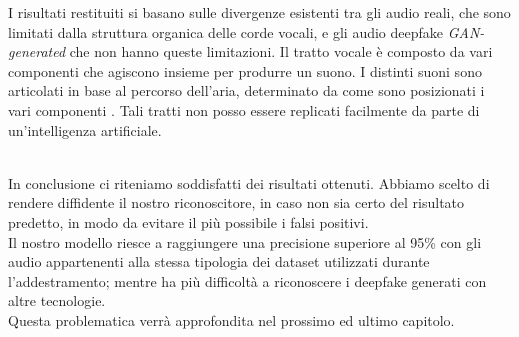 \documentclass[12pt, a4paper]{article}
\begin{document}
\begin{minipage}{0.6\textwidth}
I risultati restituiti si basano sulle divergenze esistenti tra gli audio reali, che sono limitati dalla struttura organica delle corde vocali, e gli audio deepfake \textit{GAN-generated} che non hanno queste limitazioni. Il tratto vocale è composto da vari componenti che agiscono insieme per produrre un suono. I distinti suoni sono articolati in base al percorso dell'aria, determinato da come sono posizionati i vari componenti \cite{280020}. Tali tratti non posso essere replicati facilmente da parte di un'intelligenza artificiale.\\
\end{minipage}
\\
In conclusione ci riteniamo soddisfatti dei risultati ottenuti. Abbiamo scelto di rendere diffidente il nostro riconoscitore, in caso non sia certo del risultato predetto, in modo da evitare il più possibile i falsi positivi.\\ 
Il nostro modello riesce a raggiungere una precisione superiore al 95\% con gli audio appartenenti alla stessa tipologia dei dataset utilizzati durante l'addestramento; mentre ha più difficoltà a riconoscere i deepfake generati con altre tecnologie.\\
Questa problematica verrà approfondita nel prossimo ed ultimo capitolo.
\newpage
\end{document}
